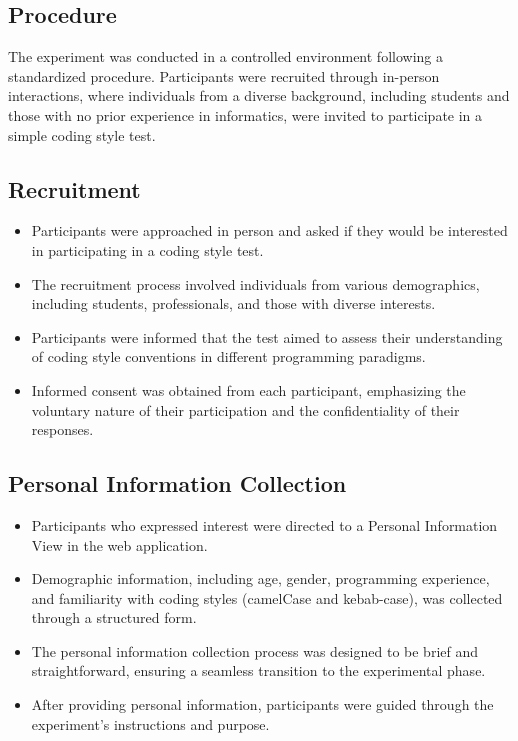 \documentclass{article}
\begin{document}
\subsection{Procedure}

The experiment was conducted in a controlled environment following a standardized procedure. Participants were recruited through in-person interactions, where individuals from a diverse background, including students and those with no prior experience in informatics, were invited to participate in a simple coding style test.

\subsection*{Recruitment}

\begin{itemize}
  \item Participants were approached in person and asked if they would be interested in participating in a coding style test.
  \item The recruitment process involved individuals from various demographics, including students, professionals, and those with diverse interests.
  \item Participants were informed that the test aimed to assess their understanding of coding style conventions in different programming paradigms.
  \item Informed consent was obtained from each participant, emphasizing the voluntary nature of their participation and the confidentiality of their responses.
\end{itemize}

\subsection*{Personal Information Collection}

\begin{itemize}
  \item Participants who expressed interest were directed to a Personal Information View in the web application.
  \item Demographic information, including age, gender, programming experience, and familiarity with coding styles (camelCase and kebab-case), was collected through a structured form.
  \item The personal information collection process was designed to be brief and straightforward, ensuring a seamless transition to the experimental phase.
  \item After providing personal information, participants were guided through the experiment's instructions and purpose.
\end{itemize}
\end{document}
